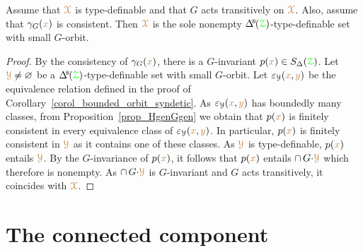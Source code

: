 \begin{proposition}
  Assume that ${\color{brown}\EuScript X}$ is type-definable and that $G$ acts transitively on ${\color{brown}\EuScript X}$.
  Also, assume that $\gamma_G({\color{brown} x})$ is consistent.
  Then ${\color{brown}\EuScript X}$ is the sole nonempty $\BDelta(\grZ)$-type-definable set with small $G$-orbit.
\end{proposition}
\begin{proof}
  By the consistency of $\gamma_G({\color{brown} x})$, there is a $G$-invariant $p({\color{brown} x})\in S_\Delta({\color{green}\EuScript Z})$.
  Let ${\color{brown}\EuScript Y}\neq\varnothing$ be a $\BDelta(\grZ)$-type-definable set with small $G$-orbit.
  Let $\varepsilon_{\EuScript Y}({\color{brown} x},{\color{brown} y})$ be the equivalence relation defined in the proof of Corollary~\ref{corol_bounded_orbit_syndetic}.
  As $\varepsilon_{\EuScript Y}({\color{brown} x},{\color{brown} y})$ has boundedly many classes, from Proposition~\ref{prop_HgenGgen} we obtain that $p({\color{brown} x})$ is finitely consistent in every equivalence class of $\varepsilon_{\EuScript Y}({\color{brown} x},{\color{brown} y})$.
  In particular, $p({\color{brown} x})$ is finitely consistent in ${\color{brown}\EuScript Y}$ as it contains one of these classes.
  As ${\color{brown}\EuScript Y}$ is type-definable, $p({\color{brown} x})$ entails ${\color{brown}\EuScript Y}$.
  By the $G$-invariance of $p({\color{brown} x})$, it follows that $p({\color{brown} x})$ entails $\cap\,G{\cdot}{\color{brown}\EuScript Y}$ which therefore is nonempty.
  As $\cap\,G{\cdot}{\color{brown}\EuScript Y}$ is $G$-invariant and $G$ acts transitively, it coincides with ${\color{brown}\EuScript X}$.
\end{proof}



\section{The connected component}\label{G0}
\def\medrel#1{\parbox[t]{5ex}{$\displaystyle\hfil #1$}}
\def\ceq#1#2#3{\parbox[t]{12ex}{$\displaystyle #1$}\medrel{#2}{$\displaystyle #3$}}

